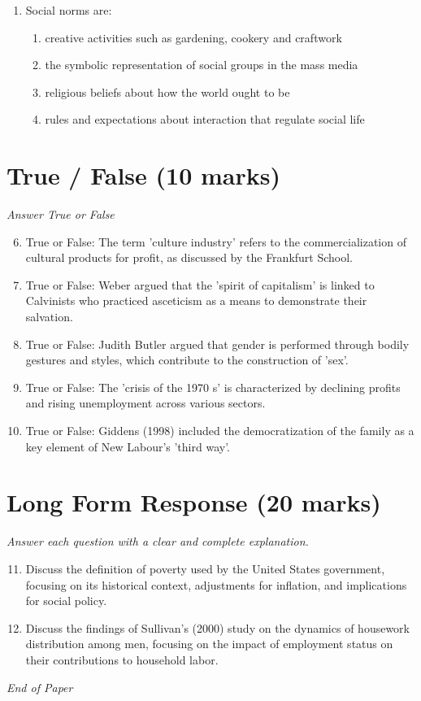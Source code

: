 \documentclass[12pt]{article}
\begin{document}
\begin{enumerate}[label=\arabic*.]
\begin{enumerate}[label=(\alph*)]
    \item a fairground ride
    \item a circus
    \item a puppet theatre
    \item a ballet
\end{enumerate}
\item Social norms are:
\begin{enumerate}[label=(\alph*)]
    \item creative activities such as gardening, cookery and craftwork
    \item the symbolic representation of social groups in the mass media
    \item religious beliefs about how the world ought to be
    \item rules and expectations about interaction that regulate social life
\end{enumerate}
\end{enumerate}

\section*{True / False (10 marks)}
\textit{Answer True or False}
\begin{enumerate}[label=\arabic*.]
\setcounter{enumi}{5}
\item True or False: The term 'culture industry' refers to the commercialization of cultural products for profit, as discussed by the Frankfurt School.
\item True or False: Weber argued that the 'spirit of capitalism' is linked to Calvinists who practiced asceticism as a means to demonstrate their salvation.
\item True or False: Judith Butler argued that gender is performed through bodily gestures and styles, which contribute to the construction of 'sex'.
\item True or False: The 'crisis of the 1970 s' is characterized by declining profits and rising unemployment across various sectors.
\item True or False: Giddens (1998) included the democratization of the family as a key element of New Labour's 'third way'.
\end{enumerate}

\section*{Long Form Response (20 marks)}
\textit{Answer each question with a clear and complete explanation.}
\begin{enumerate}[label=\arabic*.]
\setcounter{enumi}{10}
\item Discuss the definition of poverty used by the United States government, focusing on its historical context, adjustments for inflation, and implications for social policy.
\item Discuss the findings of Sullivan's (2000) study on the dynamics of housework distribution among men, focusing on the impact of employment status on their contributions to household labor.
\end{enumerate}

\vfill
\noindent\textit{End of Paper}
\end{document}
